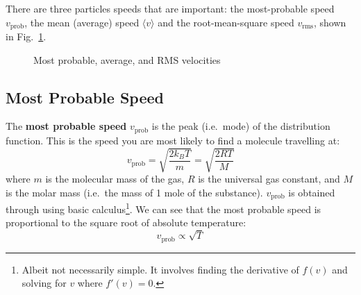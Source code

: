 There are three particles speeds that are important: the most-probable speed
$v_\text{prob}$, the mean (average) speed $\langle v \rangle$ and the
root-mean-square speed $v_\text{rms}$, shown in Fig.~\ref{fig:dist-speeds}.
\begin{figure}[ht]
  \centering
  \caption{Most probable, average, and RMS velocities}
  \label{fig:dist-speeds}
\end{figure}


\subsection{Most Probable Speed}

The \textbf{most probable speed} $v_\text{prob}$ is the peak (i.e.\ mode) of the
distribution function. This is the speed you are most likely to find a molecule
travelling at:
\begin{equation}
  v_\text{prob}=\sqrt{\frac{2k_BT}m}=\sqrt{\frac{2RT}M}
\end{equation}
where $m$ is the molecular mass of the gas, $R$ is the universal gas constant,
and $M$ is the molar mass (i.e.\ the mass of 1 mole of the substance).
$v_\text{prob}$ is obtained through using basic calculus\footnote{Albeit not
necessarily simple. It involves finding the derivative of $f(v)$ and solving
for $v$ where $f'(v)=0$.}. We can see that the most probable speed is
proportional to the square root of absolute temperature:
\begin{equation}  
  v_\text{prob}\propto\sqrt T
\end{equation}

